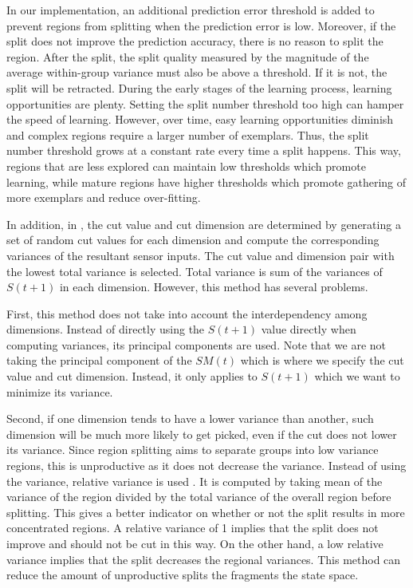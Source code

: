 In our implementation, an additional prediction error threshold is added to prevent regions from splitting when the prediction error is low. Moreover, if the split does not improve the prediction accuracy, there is no reason to split the region. After the split, the split quality measured by the magnitude of the average within-group variance must also be above a threshold. If it is not, the split will be retracted. During the early stages of the learning process, learning opportunities are plenty. Setting the split number threshold too high can hamper the speed of learning. However, over time, easy learning opportunities diminish and complex regions require a larger number of exemplars. Thus, the split number threshold grows at a constant rate every time a split happens. This way, regions that are less explored can maintain low thresholds which promote learning, while mature regions have higher thresholds which promote gathering of more exemplars and reduce over-fitting.

In addition, in \cite{Oudeyer2007}, the cut value and cut dimension are determined by generating a set of random cut values for each dimension and compute the corresponding variances of the resultant sensor inputs. The cut value and dimension pair with the lowest total variance is selected. Total variance is sum of the variances of $S(t+1)$ in each dimension. However, this method has several problems. 

First, this method does not take into account the interdependency among dimensions. Instead of directly using the $S(t+1)$ value directly when computing variances, its principal components are used. Note that we are not taking the principal component of the $SM(t)$ which is where we specify the cut value and cut dimension. Instead, it only applies to $S(t+1)$ which we want to minimize its variance. 

Second, if one dimension tends to have a lower variance than another, such dimension will be much more likely to get picked, even if the cut does not lower its variance. Since region splitting aims to separate groups into low variance regions, this is unproductive as it does not decrease the variance. Instead of using the variance, relative variance is used . It is computed by taking mean of the variance of the region divided by the total variance of the overall region before splitting. This gives a better indicator on whether or not the split results in more concentrated regions. A relative variance of 1 implies that the split does not improve and should not be cut in this way. On the other hand, a low relative variance implies that the split decreases the regional variances. This method can reduce the amount of unproductive splits the fragments the state space.


